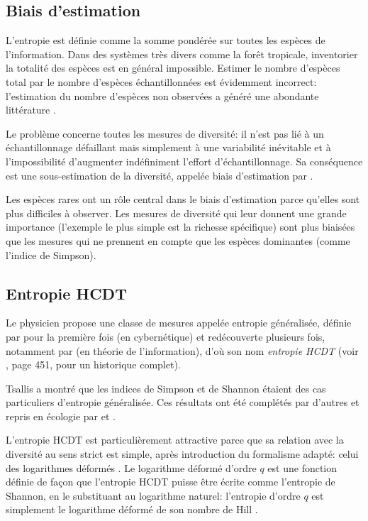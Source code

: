 \documentclass[a4paper]{article}
\begin{document}
\subsection{Biais d'estimation}

L'entropie est définie comme la somme pondérée sur toutes les espèces de l'information.
Dans des systèmes très divers comme la forêt tropicale, inventorier la totalité des espèces est en général impossible.
Estimer le nombre d'espèces total par le nombre d'espèces échantillonnées est évidemment incorrect: l'estimation du nombre d'espèces non observées a généré une abondante littérature \citep{Chao2004}.

Le problème concerne toutes les mesures de diversité: il n'est pas lié à un échantillonnage défaillant mais simplement à une variabilité inévitable et à l'impossibilité d'augmenter indéfiniment l'effort d'échantillonnage.
Sa conséquence est une sous-estimation de la diversité, appelée \og biais d'estimation\fg{} par \cite{Dauby2012}.

Les espèces rares ont un rôle central dans le biais d'estimation parce qu'elles sont plus difficiles à observer.
Les mesures de diversité qui leur donnent une grande importance (l'exemple le plus simple est la richesse spécifique) sont plus biaisées que les mesures qui ne prennent en compte que les espèces dominantes (comme l'indice de Simpson).


\subsection{Entropie HCDT}

Le physicien \cite{Tsallis1988} propose une classe de mesures appelée entropie généralisée, définie par \cite{Havrda1967} pour la première fois (en cybernétique) et redécouverte plusieurs fois, notamment par \cite{Daroczy1970} (en théorie de l'information), d'où son nom \emph{entropie HCDT} (voir \cite{Mendes2008}, page 451, pour un historique complet).

Tsallis a montré que les indices de Simpson et de Shannon étaient des cas particuliers d'entropie généralisée.
Ces résultats ont été complétés par d'autres et repris en écologie par \cite{Keylock2005} et \cite{Jost2006, Jost2007}.

L'entropie HCDT est particulièrement attractive parce que sa relation avec la diversité au sens strict est simple, après introduction du formalisme adapté: celui des logarithmes déformés \citep{Tsallis1994}.
Le logarithme déformé d'ordre $q$ est une fonction définie de façon que l'entropie HCDT puisse être écrite comme l'entropie de Shannon, en le substituant au logarithme naturel: l'entropie d'ordre $q$ est simplement le logarithme déformé de son nombre de Hill \citep{Marcon2014a}.
\end{document}
